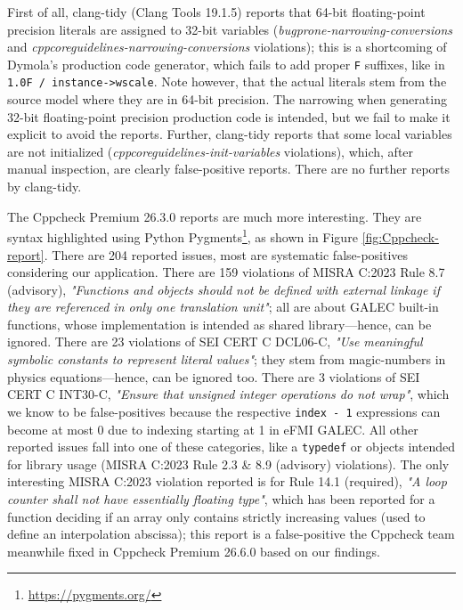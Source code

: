 First of all, clang-tidy (Clang Tools 19.1.5) reports that 64-bit floating-point precision literals are assigned to 32-bit variables (\textit{bugprone-narrowing-conversions} and \textit{cppcoreguidelines-narrowing-conversions} violations); this is a shortcoming of Dymola's production code generator, which fails to add proper \texttt{F} suffixes, like in \texttt{1.0F / instance->wscale}. Note however, that the actual literals stem from the source model where they are in 64-bit precision. The narrowing when generating 32-bit floating-point precision production code is intended, but we fail to make it explicit to avoid  the reports. Further, clang-tidy reports that some local variables are not initialized (\textit{cppcoreguidelines-init-variables} violations), which, after manual inspection, are clearly false-positive reports. There are no further reports by clang-tidy.

The Cppcheck Premium 26.3.0 reports are much more interesting. They are syntax highlighted using Python Pygments\footnote{\tiny{\url{https://pygments.org/}}}, as shown in Figure \ref{fig:Cppcheck-report}. There are 204 reported issues, most are systematic false-positives considering our application. There are 159 violations of MISRA C:2023 Rule 8.7 (advisory), \textit{"Functions and objects should not be defined with external linkage if they are referenced in only one translation unit"}; all are about GALEC built-in functions, whose implementation is intended as shared library---hence, can be ignored. There are 23 violations of SEI CERT C DCL06-C, \textit{"Use meaningful symbolic constants to represent literal values"}; they stem from magic-numbers in physics equations---hence, can be ignored too. There are 3 violations of SEI CERT C INT30-C, \textit{"Ensure that unsigned integer operations do not wrap"}, which we know to be false-positives because the respective \texttt{index - 1} expressions can become at most 0 due to indexing starting at 1 in eFMI GALEC. All other reported issues fall into one of these categories, like a \texttt{typedef} or objects intended for library usage (MISRA C:2023 Rule 2.3 \& 8.9 (advisory) violations). The only interesting MISRA C:2023 violation reported is for Rule 14.1 (required), \textit{"A loop counter shall not have essentially floating type"}, which has been reported for a function deciding if an array only contains strictly increasing values (used to define an interpolation abscissa); this report is a false-positive the Cppcheck team meanwhile fixed in Cppcheck Premium 26.6.0 based on our findings.

